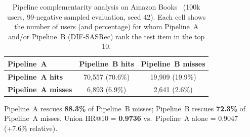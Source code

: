 \begin{table}[tbp]
\caption{Pipeline complementarity analysis on Amazon Books~\cite{hou2024amazon} (100k users,
         99-negative sampled evaluation, seed 42).
         Each cell shows the number of users (and percentage) for whom
         Pipeline~A and/or Pipeline~B (DIF-SASRec) rank the test item
         in the top 10.}
\label{tab:complementarity}
\centering
\begin{tabular}{lcc}
\toprule
\textbf{Pipeline~A} & \textbf{Pipeline~B hits} & \textbf{Pipeline~B misses} \\
\midrule
\textbf{Pipeline~A hits}   & 70{,}557 (70.6\%) & 19{,}909 (19.9\%) \\
\textbf{Pipeline~A misses} &  6{,}893 (6.9\%)  &  2{,}641 (2.6\%)  \\
\bottomrule
\end{tabular}
\vspace{4pt}

\noindent
Pipeline~A rescues \textbf{88.3\%} of Pipeline~B misses;
Pipeline~B rescues \textbf{72.3\%} of Pipeline~A misses.
Union HR@10 = \textbf{0.9736} vs.\ Pipeline~A alone = 0.9047
(+7.6\% relative).
\end{table}
